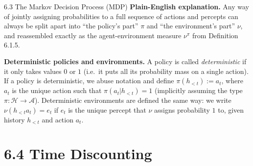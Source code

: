\documentclass[aspectratio=169,10pt]{beamer}
\newcommand{\A}{\mathcal{A}}
\newcommand{\Hcal}{\mathcal{H}}
\begin{document}
\begin{frame}[allowframebreaks]{6.3 The Markov Decision Process (MDP)}
\textbf{Plain-English explanation.} Any way of jointly assigning
probabilities to a full sequence of actions and percepts can always be
split apart into ``the policy's part'' $\pi$ and ``the environment's part''
$\nu$, and reassembled exactly as the agent-environment measure $\nu^\pi$
from Definition 6.1.5.

\vspace{0.2cm}
\textbf{Deterministic policies and environments.} A policy is called
\emph{deterministic} if it only takes values $0$ or $1$ (i.e.\ it puts all
its probability mass on a single action). If a policy is deterministic, we
abuse notation and define $\pi(h_{<t}) := a_t$, where $a_t$ is the unique
action such that $\pi(a_t|h_{<t}) = 1$ (implicitly assuming the type
$\pi: \Hcal \to \A$). Deterministic environments are defined the same way:
we write $\nu(h_{<t}a_t) = e_t$ if $e_t$ is the unique percept that $\nu$
assigns probability $1$ to, given history $h_{<t}$ and action $a_t$.
\end{frame}

\section{6.4 Time Discounting}
\end{document}
